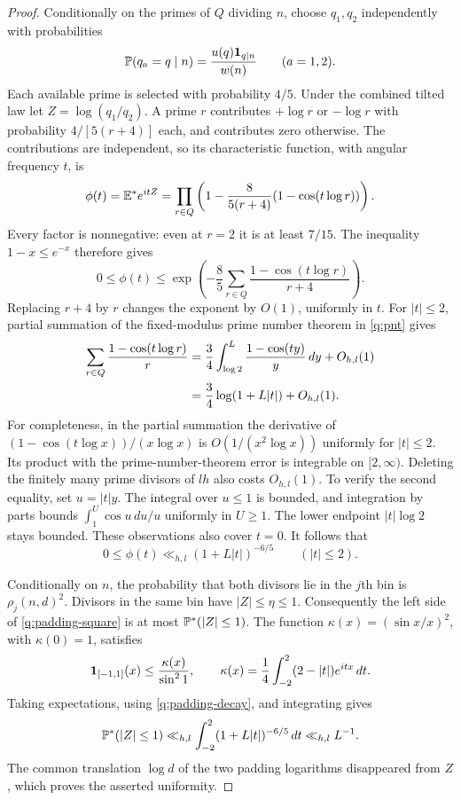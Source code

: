 \begin{proof}
Conditionally on the primes of $Q$ dividing $n$, choose $q_1,q_2$
independently with probabilities
\[
 \mathbb P(q_a=q\mid n)=\frac{u(q)\mathbf 1_{q\mid n}}{w(n)}
 \qquad(a=1,2).
\]
Each available prime is selected with probability $4/5$.  Under the
combined tilted law let $Z=\log(q_1/q_2)$.  A prime $r$ contributes
$+\log r$ or $-\log r$ with probability $4/[5(r+4)]$ each, and contributes
zero otherwise.  The contributions are independent, so its characteristic
function, with angular frequency $t$, is
\begin{equation}\label{q:padding-characteristic}
 \phi(t)=\mathbb E^*e^{itZ}
 =\prod_{r\in Q}\left(1-\frac8{5(r+4)}
                              (1-\cos(t\log r))\right).
\end{equation}
Every factor is nonnegative: even at $r=2$ it is at least $7/15$.
The inequality $1-x\le e^{-x}$ therefore gives
\[
 0\le\phi(t)\le
 \exp\left(-\frac85\sum_{r\in Q}
                     \frac{1-\cos(t\log r)}{r+4}\right).
\]
Replacing $r+4$ by $r$ changes the exponent by $O(1)$, uniformly in $t$.
For $|t|\le2$, partial summation of the fixed-modulus prime number theorem
in \eqref{q:pnt} gives
\begin{align}
 \sum_{r\in Q}\frac{1-\cos(t\log r)}r
 &=\frac34\int_{\log2}^L\frac{1-\cos(ty)}y\,dy+O_{h,l}(1)
       \notag\\
 &=\frac34\log(1+L|t|)+O_{h,l}(1).\label{q:padding-pnt}
\end{align}
For completeness, in the partial summation the derivative of
$(1-\cos(t\log x))/(x\log x)$ is $O(1/(x^2\log x))$ uniformly for
$|t|\le2$.  Its product with the prime-number-theorem error is integrable
on $[2,\infty)$.  Deleting the finitely many prime divisors of $lh$ also
costs $O_{h,l}(1)$.  To verify the second equality, set $u=|t|y$.
The integral over $u\le1$ is bounded, and integration by parts bounds
$\int_1^U\cos u\,du/u$ uniformly in $U\ge1$.  The lower endpoint
$|t|\log2$ stays bounded.  These observations also cover $t=0$.
It follows that
\begin{equation}\label{q:padding-decay}
 0\le\phi(t)\ll_{h,l}(1+L|t|)^{-6/5}\qquad(|t|\le2).
\end{equation}

Conditionally on $n$, the probability that both divisors lie in the
$j$th bin is $\rho_j(n,d)^2$. Divisors in the same bin have
$|Z|\le\eta\le1$. Consequently the left side of
\eqref{q:padding-square} is at most
$\mathbb P^*(|Z|\le1)$.  The function
$\kappa(x)=(\sin x/x)^2$, with $\kappa(0)=1$, satisfies
\[
 \mathbf 1_{[-1,1]}(x)\le\frac{\kappa(x)}{\sin^2 1},\qquad
 \kappa(x)=\frac14\int_{-2}^2(2-|t|)e^{itx}\,dt.
\]
Taking expectations, using \eqref{q:padding-decay}, and integrating gives
\[
 \mathbb P^*(|Z|\le1)
 \ll_{h,l}\int_{-2}^2(1+L|t|)^{-6/5}\,dt
 \ll_{h,l}L^{-1}.
\]
The common translation $\log d$ of the two padding logarithms disappeared
from $Z$, which proves the asserted uniformity.
\end{proof}

